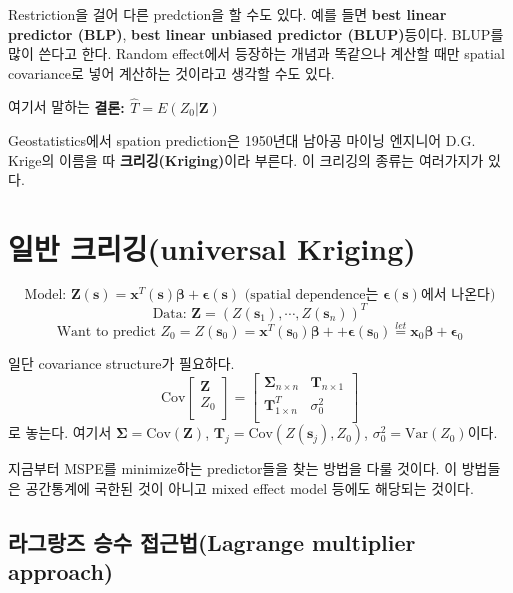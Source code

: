 \documentclass[b5paper,]{book}
\theoremstyle{definition}
\theoremstyle{definition}
\theoremstyle{definition}
\theoremstyle{remark}
\begin{document}
Restriction을 걸어 다른 predction을 할 수도 있다. 예를 들면 \textbf{best
linear predictor (BLP)}, \textbf{best linear unbiased predictor
(BLUP)}등이다. BLUP를 많이 쓴다고 한다. Random effect에서 등장하는
개념과 똑같으나 계산할 때만 spatial covariance로 넣어 계산하는 것이라고
생각할 수도 있다.

여기서 말하는 \textbf{결론: \(\hat{T}=E(Z_{0}|\mathbf{Z})\)}

Geostatistics에서 spation prediction은 1950년대 남아공 마이닝 엔지니어
D.G. Krige의 이름을 따 \textbf{크리깅(Kriging)}이라 부른다. 이 크리깅의
종류는 여러가지가 있다.

\section{일반 크리깅(universal Kriging)}\label{-universal-kriging}

\[\text{Model: } \mathbf{Z}(\mathbf{s})=\mathbf{x}^{T}(\mathbf{s})\boldsymbol{\beta}+\boldsymbol{\epsilon}(\mathbf{s}) \text{ (spatial dependence는 } \boldsymbol{\epsilon}(\mathbf{s})\text{에서 나온다)}\]
\[\text{Data: } \mathbf{Z}=(Z(\mathbf{s}_{1}), \cdots , Z(\mathbf{s}_{n}))^{T}\]
\[\text{Want to predict } Z_{0}=Z(\mathbf{s}_{0})=\mathbf{x}^{T}(\mathbf{s}_{0})\boldsymbol{\beta}+\mathbf+\boldsymbol{\epsilon}(\mathbf{s}_{0})\stackrel{let}{=}\mathbf{x}_{0}\boldsymbol{\beta}+\boldsymbol{\epsilon}_{0}\]

일단 covariance structure가 필요하다. \[
\text{Cov}\left[\begin{array}
{r}
\mathbf{Z}\\
Z_{0}\\
\end{array}\right]
=
\left[\begin{array}
{rr}
\boldsymbol{\Sigma}_{n\times n} & \mathbf{T}_{n \times 1}\\
\mathbf{T}_{1\times n}^{T} & \sigma_{0}^{2}\\
\end{array}\right]
\] 로 놓는다. 여기서 \(\boldsymbol{\Sigma}=\text{Cov}(\mathbf{Z})\),
\(\mathbf{T}_{j}=\text{Cov}(Z(\mathbf{s}_{j}), Z_{0})\),
\(\sigma_{0}^{2}=\text{Var}(Z_{0})\)이다.

지금부터 MSPE를 minimize하는 predictor들을 찾는 방법을 다룰 것이다. 이
방법들은 공간통계에 국한된 것이 아니고 mixed effect model 등에도
해당되는 것이다.

\subsection{라그랑즈 승수 접근법(Lagrange multiplier
approach)}\label{--lagrange-multiplier-approach}
\end{document}
